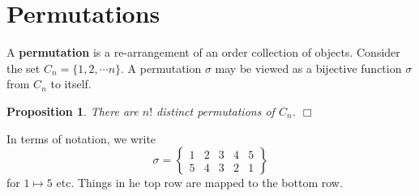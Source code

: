 \documentclass[letter-paper]{tufte-book}
\newtheorem{proposition}[theorem]{\color{pastel-blue}Proposition}
\newcommand\Def[1]{\textbf{#1}}
\newcommand{\qedwhite}{\hfill \ensuremath{\Box}}
\begin{document}
\section{Permutations}

A \Def{permutation} is a re-arrangement of an order collection of objects.
Consider the set $C_n=\{1,2,\cdots n\}$. A permutation $\sigma$ may be viewed as
a bijective function $\sigma$ from $C_n$ to itself.

\begin{proposition}
  There are $n!$ distinct permutations of $C_n$. \qedwhite
\end{proposition}
In terms of notation, we write
\begin{equation*}
  \sigma=\left\{\begin{matrix}1 & 2 & 3 & 4 & 5\\
  5 & 4 & 3 & 2 & 1\end{matrix}\right\}
\end{equation*}
for $1\mapsto5$ etc. Things in he top row are mapped to the bottom row.
\end{document}
